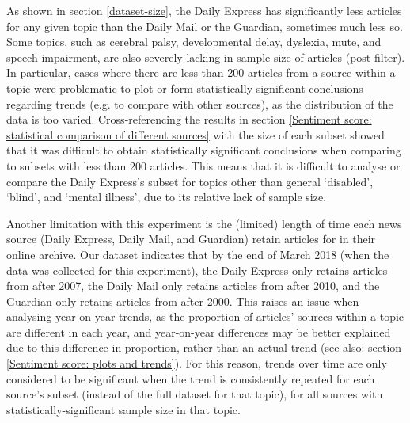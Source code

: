 \documentclass{report}
\newcommand{\textapprox}{\raisebox{0.5ex}{\texttildelow}}  %
\begin{document}
As shown in section \ref{dataset-size}, the Daily Express has significantly less articles for any given topic than the Daily Mail or the Guardian, sometimes much less so.
Some topics, such as cerebral palsy, developmental delay, dyslexia, mute, and speech impairment, are also severely lacking in sample size of articles (post-filter).
In particular, cases where there are less than \textapprox200 articles from a source within a topic were problematic to plot or form statistically-significant conclusions regarding trends (e.g. to compare with other sources), as the distribution of the data is too varied.
Cross-referencing the results in section \ref{Sentiment score: statistical comparison of different sources} with the size of each subset showed that it was difficult to obtain statistically significant conclusions when comparing to subsets with less than \textapprox200 articles.
This means that it is difficult to analyse or compare the Daily Express's subset for topics other than general `disabled', `blind', and `mental illness', due to its relative lack of sample size.

Another limitation with this experiment is the (limited) length of time each news source (Daily Express, Daily Mail, and Guardian) retain articles for in their online archive.
Our dataset indicates that by the end of March 2018 (when the data was collected for this experiment), the Daily Express only retains articles from after \textapprox2007, the Daily Mail only retains articles from after \textapprox2010, and the Guardian only retains articles from after \textapprox2000. 
This raises an issue when analysing year-on-year trends, as the proportion of articles' sources within a topic are different in each year, and year-on-year differences may be better explained due to this difference in proportion, rather than an actual trend (see also: section \ref{Sentiment score: plots and trends}).
For this reason, trends over time are only considered to be significant when the trend is consistently repeated for each source's subset (instead of the full dataset for that topic), for all sources with statistically-significant sample size in that topic. 
\end{document}
